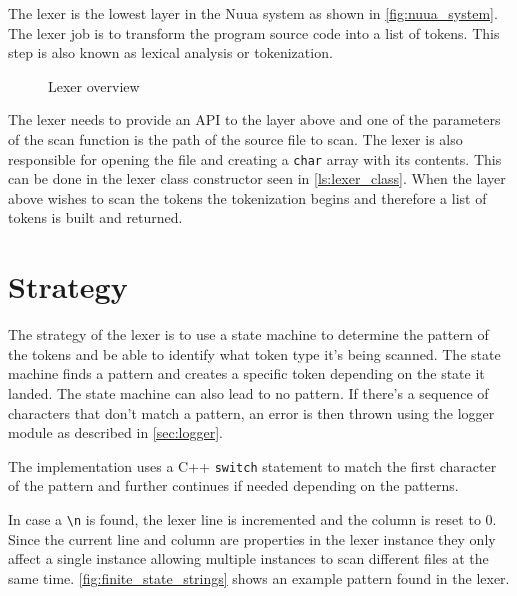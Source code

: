 The lexer is the lowest layer in the Nuua system as shown in \autoref{fig:nuua_system}. The lexer job is to transform
the program source code into a list of tokens. This step is also known as lexical analysis or tokenization.

\begin{figure}[H]
    \centering

    \caption{Lexer overview}
    \label{fig:lexer_overview}
\end{figure}

The lexer needs to provide an API to the layer above and one of the parameters of the scan function is the path of the
source file to scan. The lexer is also responsible for opening the file and creating a \texttt{char} array with its contents. This can be
done in the lexer class constructor seen in \autoref{ls:lexer_class}.
When the layer above wishes to scan the tokens the tokenization begins and therefore a list of tokens is built and returned.

\section{Strategy}

The strategy of the lexer is to use a state machine to determine the pattern of the tokens and be able to identify
what token type it's being scanned. The state machine finds a pattern and creates a specific token depending on
the state it landed. The state machine can also lead to no pattern. If there's a sequence of characters that don't match
a pattern, an error is then thrown using the logger module as described in \autoref{sec:logger}.

The implementation uses a C++ \texttt{switch} statement to match the first character of the pattern and further continues if needed
depending on the patterns.

In case a \texttt{\textbackslash n} is found, the lexer line is incremented and the column is reset to $0$. Since the current line and column
are properties in the lexer instance they only affect a single instance allowing multiple instances to scan different files at the same
time. \autoref{fig:finite_state_strings} shows an example pattern found in the lexer.

